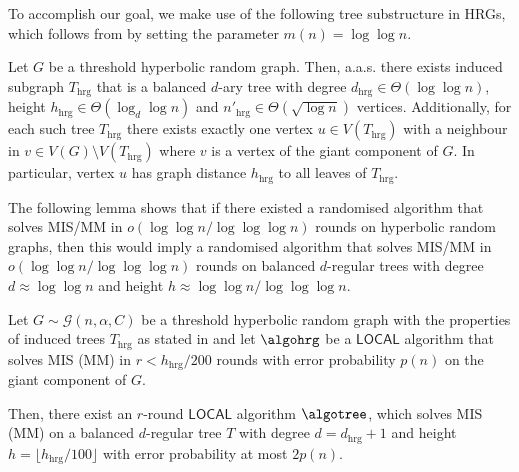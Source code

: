 \documentclass[letterpaper,11pt]{article}
\newcommand{\aas}{a.a.s.\xspace}
\newcommand{\1}{\mathbb I}
\newcommand{\hrg}{\mathcal{G}(n, \alpha, C)}
\newcommand{\LOCAL}{\ensuremath{\mathsf{LOCAL}}\xspace}
\begin{document}
To accomplish our goal, we make use of the following tree substructure in HRGs, which follows from  by setting the parameter $m(n) = \log\log n$.
%
\begin{corollary}\label{cor:d-reg-tree}
Let $G$ be a threshold hyperbolic random graph. Then, \aas there exists induced subgraph $T_{\text{hrg}}$ that is a balanced $d$-ary tree with degree $d_{\text{hrg}} \in \Theta(\log\log n)$, height $h_{\text{hrg}} \in \Theta(\log_d\log n)$ and $n'_{\text{hrg}} \in \Theta(\sqrt{\log n})$ vertices. Additionally, for each such tree $T_{\text{hrg}}$ there exists exactly one vertex $u \in V(T_{\text{hrg}})$ with a neighbour in $v \in V(G)\setminus V(T_{\text{hrg}})$ where $v$ is a vertex of the giant component of $G$. In particular, vertex $u$ has graph distance $h_{\text{hrg}}$ to all leaves of $T_{\text{hrg}}$.
\end{corollary}
%
The following lemma shows that if there existed a randomised algorithm that solves MIS/MM in $o(\log\log n / \log\log\log n)$ rounds on hyperbolic random graphs, then this would imply a randomised algorithm that solves MIS/MM in $o(\log\log n / \log\log\log n)$ rounds on balanced $d$-regular trees with degree $d \approx \log\log n$ and height $h \approx \log\log n /\log\log\log n$. 
%
\begin{lemma}\label{lem:algotree}
Let $G\sim\hrg$ be a threshold hyperbolic random graph with the properties of induced trees $T_{\text{hrg}}$ as stated in  and let $\algohrg$ be a \LOCAL algorithm that solves MIS (MM) in $r < h_{\text{hrg}}/200$ rounds with error probability $p(n)$ on the giant component of $G$. 

Then, there exist an $r$-round \LOCAL algorithm $\algotree$, which solves MIS (MM) on a balanced $d$-regular tree $T$ with degree  $d=d_{\text{hrg}} + 1$ and height $h = \lfloor h_{\text{hrg}}/100 \rfloor$ with error probability at most $2p(n)$.
\end{lemma}
%
\end{document}
